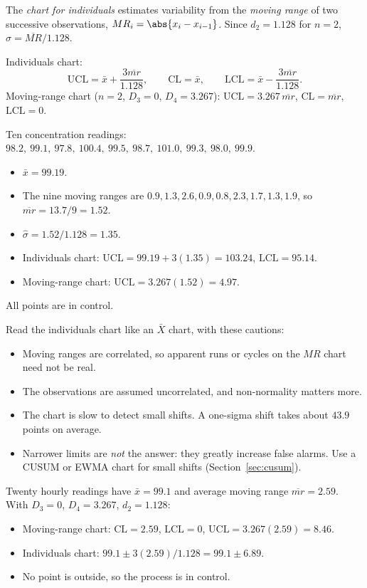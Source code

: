The \emph{chart for individuals} estimates variability from the \emph{moving range} of two successive observations, $MR_i=\abs{x_i-x_{i-1}}$. Since $d_2=1.128$ for $n=2$, $\hat\sigma=\overline{MR}/1.128$.

\begin{theorem}\label{thm:individuals}
Individuals chart:
\[ \mathrm{UCL}=\bar{x}+\frac{3\overline{mr}}{1.128},\qquad\mathrm{CL}=\bar{x},\qquad\mathrm{LCL}=\bar{x}-\frac{3\overline{mr}}{1.128}. \]
Moving-range chart ($n=2$, $D_3=0$, $D_4=3.267$): $\mathrm{UCL}=3.267\,\overline{mr}$, $\mathrm{CL}=\overline{mr}$, $\mathrm{LCL}=0$.
\end{theorem}

\begin{example}
Ten concentration readings: $98.2,\ 99.1,\ 97.8,\ 100.4,\ 99.5,\ 98.7,\ 101.0,\ 99.3,\ 98.0,\ 99.9$.
\begin{itemize}
  \item $\bar{x}=99.19$.
  \item The nine moving ranges are $0.9,1.3,2.6,0.9,0.8,2.3,1.7,1.3,1.9$, so $\overline{mr}=13.7/9=1.52$.
  \item $\hat\sigma=1.52/1.128=1.35$.
  \item Individuals chart: $\mathrm{UCL}=99.19+3(1.35)=103.24$, $\mathrm{LCL}=95.14$.
  \item Moving-range chart: $\mathrm{UCL}=3.267(1.52)=4.97$.
\end{itemize}
All points are in control.
\end{example}

Read the individuals chart like an $\bar{X}$ chart, with these cautions:
\begin{itemize}
  \item Moving ranges are correlated, so apparent runs or cycles on the $MR$ chart need not be real.
  \item The observations are assumed uncorrelated, and non-normality matters more.
  \item The chart is slow to detect small shifts. A one-sigma shift takes about $43.9$ points on average.
  \item Narrower limits are \emph{not} the answer: they greatly increase false alarms. Use a CUSUM or EWMA chart for small shifts (Section~\ref{sec:cusum}).
\end{itemize}

\begin{example}[Concentration]
Twenty hourly readings have $\bar{x}=99.1$ and average moving range $\overline{mr}=2.59$. With $D_3=0$, $D_4=3.267$, $d_2=1.128$:
\begin{itemize}
  \item Moving-range chart: $\mathrm{CL}=2.59$, $\mathrm{LCL}=0$, $\mathrm{UCL}=3.267(2.59)=8.46$.
  \item Individuals chart: $99.1\pm3(2.59)/1.128=99.1\pm6.89$.
  \item No point is outside, so the process is in control.
\end{itemize}
\end{example}

